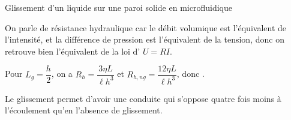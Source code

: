 \begin{exo}[PC][1][devoir]{Glissement d'un liquide sur une paroi solide en microfluidique}
\begin{quest}
{On parle de résistance hydraulique car le débit volumique est l'équivalent de l'intensité, et la différence de pression est l'équivalent de la tension, donc on retrouve bien l'équivalent de la loi d' $U=RI$.
}

{
  Pour $L_g=\dfrac{h}{2}$, on a $R_h=\dfrac{3\eta L}{\ell h^3}$ et $R_{h,ng}=\dfrac{12\eta L}{\ell h^3}$, donc .

Le glissement permet d'avoir une conduite qui s'oppose quatre fois moins à l'écoulement qu'en l'absence de glissement.
}

\end{quest}

\end{exo}

